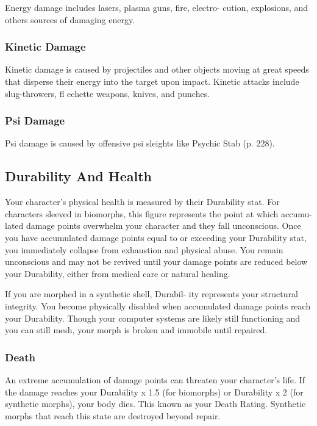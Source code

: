 Energy damage includes lasers, plasma guns, fire, electro-
cution, explosions, and others sources of damaging energy.

\subsubsection{Kinetic Damage}

Kinetic damage is caused by projectiles and other 
objects moving at great speeds that disperse their 
energy into the target upon impact. Kinetic attacks 
include slug-throwers, fl echette weapons, knives, 
and punches.

\subsubsection{Psi Damage}

Psi damage is caused by offensive psi sleights like 
Psychic Stab (p. 228).

\subsection{Durability And Health}

Your character's physical health is measured by their 
Durability stat. For characters sleeved in biomorphs, 
this figure represents the point at which accumu-
lated damage points overwhelm your character and 
they fall unconscious. Once you have accumulated 
damage points equal to or exceeding your Durability 
stat, you immediately collapse from exhaustion and 
physical abuse. You remain unconscious and may 
not be revived until your damage points are reduced 
below your Durability, either from medical care or 
natural healing.

If you are morphed in a synthetic shell, Durabil-
ity represents your structural integrity. You become 
physically disabled when accumulated damage points 
reach your Durability. Though your computer systems 
are likely still functioning and you can still mesh, your 
morph is broken and immobile until repaired.

\subsubsection{Death}

An extreme accumulation of damage points can 
threaten your character's life. If the damage reaches 
your Durability x 1.5 (for biomorphs) or Durability x 
2 (for synthetic morphs), your body dies. This known 
as your Death Rating. Synthetic morphs that reach 
this state are destroyed beyond repair.

